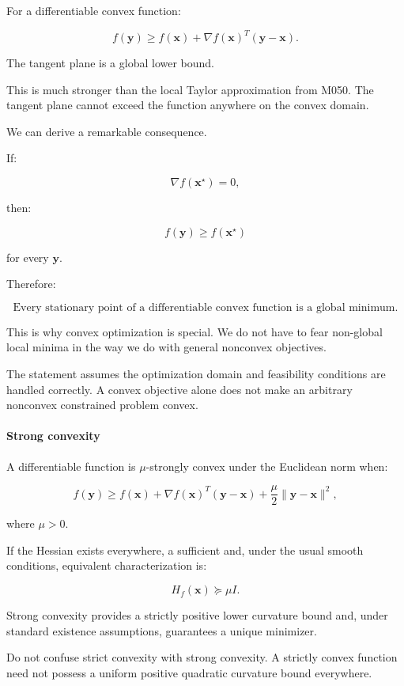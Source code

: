 For a differentiable convex function:

\[
\boxed{ f(\mathbf y)\ge f(\mathbf x)+ \nabla f(\mathbf x)^T(\mathbf y-\mathbf x) }.
\]

The tangent plane is a global lower bound.

This is much stronger than the local Taylor approximation from M050. The tangent plane cannot exceed the function anywhere on the convex domain.

We can derive a remarkable consequence.

If:

\[
\nabla f(\mathbf x^\star)=0,
\]

then:

\[
f(\mathbf y)\ge f(\mathbf x^\star)
\]

for every \(\mathbf y\).

Therefore:

\[
\boxed{ \text{Every stationary point of a differentiable convex function is a global minimum.} }
\]

This is why convex optimization is special. We do not have to fear non-global local minima in the way we do with general nonconvex objectives.

The statement assumes the optimization domain and feasibility conditions are handled correctly. A convex objective alone does not make an arbitrary nonconvex constrained problem convex.

\paragraph{Strong convexity}\label{02-foundations-ii-ch026-strong-convexity}

A differentiable function is \(\mu\)-strongly convex under the Euclidean norm when:

\[
f(\mathbf y)\ge f(\mathbf x)+ \nabla f(\mathbf x)^T(\mathbf y-\mathbf x) +\frac\mu2\|\mathbf y-\mathbf x\|^2,
\]

where \(\mu>0\).

If the Hessian exists everywhere, a sufficient and, under the usual smooth conditions, equivalent characterization is:

\[
H_f(\mathbf x)\succeq\mu I.
\]

Strong convexity provides a strictly positive lower curvature bound and, under standard existence assumptions, guarantees a unique minimizer.

Do not confuse strict convexity with strong convexity. A strictly convex function need not possess a uniform positive quadratic curvature bound everywhere.

